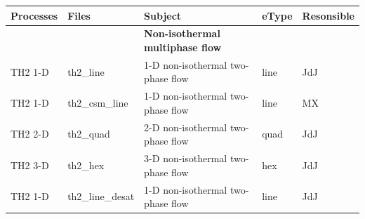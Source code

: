 \begin{center}
\begin{tabular*}{12.7cm}{|p{1.5cm}|p{1.8cm}|p{4.78cm}|p{1cm}|p{1.5cm}|} \hline
Processes & Files & Subject                & eType & Resonsible \\
\hline \hline
           &             & \textbf{Non-isothermal multiphase flow} & &  \\
TH2 1-D    & th2\_line   & 1-D non-isothermal two-phase flow & line & JdJ  \\
TH2 1-D    & th2\_csm\_line & 1-D non-isothermal two-phase flow & line & MX  \\
TH2 2-D    & th2\_quad   & 2-D non-isothermal two-phase flow & quad & JdJ  \\
TH2 3-D    & th2\_hex   & 3-D non-isothermal two-phase flow & hex & JdJ  \\
TH2 1-D    & th2\_line\_desat   & 1-D non-isothermal two-phase flow & line & JdJ  \\
\hline
\end{tabular*}
\end{center}
